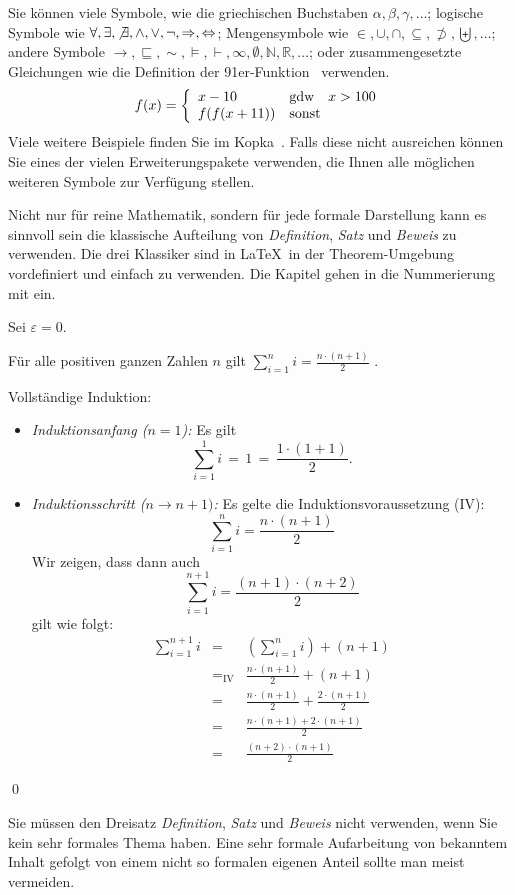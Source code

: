 \documentclass[11pt,a4paper]{report}
\begin{document}
Sie können viele Symbole, wie die griechischen Buchstaben 
$\alpha, \beta, \gamma, \ldots$;
logische Symbole wie $\forall, \exists, \not\exists, \wedge, \vee, \neg,
\Rightarrow, \Leftrightarrow$;
Mengensymbole wie $\in, \cup, \cap, \subseteq, \not\supset, 
\biguplus, \ldots$;
andere Symbole $\rightarrow, \sqsubseteq, \sim, 
\models, \vdash, \infty, \emptyset, \mathbb{N}, \mathbb{R}, \ldots$;
oder zusammengesetzte Gleichungen 
wie die Definition der 91er-Funktion~\cite{manna70}
verwenden.
\[
  f(x) = \left\{ \begin{array}{lll}
      x-10 & \mbox{gdw} & x>100 \\
      f(f(x+11)) & \multicolumn{2}{l}{\mbox{sonst}} 
    \end{array} \right.
\]
Viele weitere Beispiele finden Sie im Kopka~\cite{kopka}.
Falls diese nicht ausreichen können Sie eines der vielen
Erweiterungspakete verwenden, die Ihnen alle möglichen 
weiteren Symbole zur Verfügung stellen.

Nicht nur für reine Mathematik, sondern für jede formale
Darstellung kann es sinnvoll sein die klassische Aufteilung
von \emph{Definition}, \emph{Satz} und \emph{Beweis}
zu verwenden. 
Die drei Klassiker sind in \LaTeX\ in der Theorem-Umgebung 
vordefiniert und einfach zu verwenden.
Die Kapitel gehen in die Nummerierung mit ein.

\begin{definition}
Sei $\varepsilon = 0$.
\end{definition}

\begin{satz}
Für alle positiven ganzen Zahlen $n$ gilt 
$\sum_{i=1}^n i = \frac{n \cdot (n+1)}{2}$ \enspace.
\end{satz}
\begin{beweis}
Vollständige Induktion:
\begin{itemize}
\item \emph{Induktionsanfang ($n=1$):} Es gilt  
\[
  \sum_{i=1}^1 i \, = \, 1 \, = \, \frac{1 \cdot (1+1)}{2}.
\]
\item \emph{Induktionsschritt ($n \rightarrow n+1)$:}
Es gelte die Induktionsvoraussetzung (IV):
\[
\sum_{i=1}^n i = \frac{n \cdot (n+1)}{2}
\]
Wir zeigen, dass dann auch 
\[
\sum_{i=1}^{n+1} i = \frac{(n+1) \cdot (n+2)}{2}
\]
gilt wie folgt:
\begin{eqnarray*}
  \sum_{i=1}^{n+1} i 
  & = & (\sum_{i=1}^{n} i) + (n+1)  \\
  & =_{\mbox{IV}} & \frac{n \cdot (n+1)}{2} + (n+1) \\
  & = & \frac{n \cdot (n+1)}{2} + \frac{2 \cdot (n+1)}{2} \\
  & = & \frac{n \cdot (n+1) + 2 \cdot (n+1)}{2} \\
  & = & \frac{(n+2) \cdot (n+1)}{2} 
\end{eqnarray*}
\end{itemize}
\qed
\end{beweis}
Sie müssen den Dreisatz 
\emph{Definition}, \emph{Satz} und \emph{Beweis} nicht verwenden, 
wenn Sie kein sehr formales Thema haben. 
Eine sehr formale Aufarbeitung von bekanntem Inhalt gefolgt 
von einem nicht so formalen eigenen Anteil sollte man 
meist vermeiden.
\end{document}
